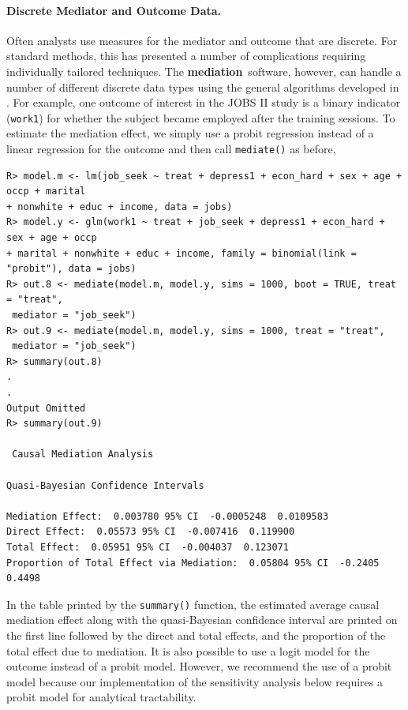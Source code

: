 \documentclass[11pt,letterpaper]{article}
\theoremstyle{plain}
\newcommand\bmediation{{\bf mediation}}
\begin{document}
\paragraph{Discrete Mediator and Outcome Data.}

Often analysts use measures for the mediator and outcome that are
discrete.  For standard methods, this has presented a number of
complications requiring individually tailored techniques.  The
\bmediation\ software, however, can handle a number of different
discrete data types using the general algorithms developed in
\citet{imai:keel:ting:10}.  For example, one outcome of interest in
the JOBS II study is a binary indicator (\texttt{work1}) for whether
the subject became employed after the training sessions. To estimate
the mediation effect, we simply use a probit regression instead of a
linear regression for the outcome and then call \texttt{mediate()} as
before,
\begin{verbatim}
R> model.m <- lm(job_seek ~ treat + depress1 + econ_hard + sex + age + occp + marital
+ nonwhite + educ + income, data = jobs)
R> model.y <- glm(work1 ~ treat + job_seek + depress1 + econ_hard + sex + age + occp
+ marital + nonwhite + educ + income, family = binomial(link = "probit"), data = jobs)
R> out.8 <- mediate(model.m, model.y, sims = 1000, boot = TRUE, treat = "treat", 
 mediator = "job_seek")
R> out.9 <- mediate(model.m, model.y, sims = 1000, treat = "treat", 
 mediator = "job_seek")
R> summary(out.8)
.
.
Output Omitted
R> summary(out.9)

 Causal Mediation Analysis 

Quasi-Bayesian Confidence Intervals

Mediation Effect:  0.003780 95% CI  -0.0005248  0.0109583 
Direct Effect:  0.05573 95% CI  -0.007416  0.119900 
Total Effect:  0.05951 95% CI  -0.004037  0.123071 
Proportion of Total Effect via Mediation:  0.05804 95% CI  -0.2405  0.4498 
\end{verbatim}

In the table printed by the \texttt{summary()} function, the estimated
average causal mediation effect along with the quasi-Bayesian
confidence interval are printed on the first line followed by the
direct and total effects, and the proportion of the total effect due
to mediation.  It is also possible to use a logit model for the
outcome instead of a probit model.  However, we recommend the use of a
probit model because our implementation of the sensitivity analysis
below requires a probit model for analytical tractability.
\end{document}
